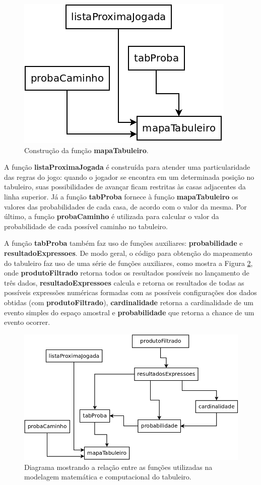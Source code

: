 \documentclass[12pt]{article}
\begin{document}
\begin{figure}[ht!]
	\centering
	\includegraphics[width=0.45\linewidth]{img/construcao_mapaTabuleiro.png}
	\caption{Construção da função \textbf{mapaTabuleiro}.}
	\label{construcao_mapaTabuleiro}
\end{figure}

A função \textbf{listaProximaJogada} é construída para atender uma particularidade das regras do jogo: quando o jogador se encontra em um determinada posição no tabuleiro, suas possibilidades de avançar ficam restritas às casas adjacentes da linha superior. Já a função \textbf{tabProba} fornece à função \textbf{mapaTabuleiro} os valores das probabilidades de cada casa, de acordo com o valor da mesma. Por último, a função \textbf{probaCaminho} é utilizada para calcular o valor da probabilidade de cada possível caminho no tabuleiro.

A função \textbf{tabProba} também faz uso de funções auxiliares: \textbf{probabilidade} e \textbf{resultadoExpressoes}. De modo geral, o código para obtenção do mapeamento do tabuleiro faz uso de uma série de funções auxiliares, como mostra a Figura \ref{funcoes_auxiliares_mapaTabuleiro}, onde \textbf{produtoFiltrado} retorna todos os resultados possíveis no lançamento de três dados, \textbf{resultadoExpressoes} calcula e retorna os resultados de todas as possíveis expressões numéricas formadas com as possíveis configurações dos dados obtidas (com \textbf{produtoFiltrado}), \textbf{cardinalidade} retorna a cardinalidade de um evento simples do espaço amostral e \textbf{probabilidade} que retorna a chance de um evento ocorrer.

\begin{figure}[ht!]
	\centering
	\includegraphics[width=0.9\linewidth]{img/funcoes_auxiliares_mapaTabuleiro.png}
	\caption{Diagrama mostrando a relação entre as funções utilizadas na modelagem matemática e computacional do tabuleiro.}
	\label{funcoes_auxiliares_mapaTabuleiro}
\end{figure}
\end{document}
